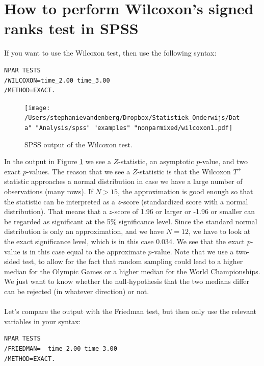 \documentclass[]{report}\usepackage[]{graphicx}\usepackage[]{color}
\begin{document}
\section{How to perform Wilcoxon's signed ranks test in SPSS}

If you want to use the Wilcoxon test, then use the following syntax:

\begin{verbatim}
NPAR TESTS
/WILCOXON=time_2.00 time_3.00
/METHOD=EXACT.
\end{verbatim}


\begin{figure}[h]
    \begin{center}
       \texttt{[image: /Users/stephanievandenberg/Dropbox/Statistiek\_Onderwijs/Data" "Analysis/spss" "examples" "nonparmixed/wilcoxon1.pdf]}
    \end{center}
    \caption{SPSS output of the Wilcoxon test.}
    \label{fig:wilcoxon1}
\end{figure}

In the output in Figure \ref{fig:wilcoxon1} we see a $Z$-statistic, an asymptotic $p$-value, and two exact $p$-values. The reason that we see a $Z$-statistic is that the Wilcoxon $T^+$ statistic approaches a normal distribution in case we have a large number of observations (many rows). If $N>15$, the approximation is good enough so that the statistic can be interpreted as a $z$-score (standardized score with a normal distribution). That means that a $z$-score of 1.96 or larger or -1.96 or smaller can be regarded as significant at the 5\% significance level. Since the standard normal distribution is only an approximation, and we have $N=12$, we have to look at the exact significance level, which is in this case 0.034. We see that the exact $p$-value is in this case equal to the approximate $p$-value. Note that we use a two-sided test, to allow for the fact that random sampling could lead to a higher median for the Olympic Games or a higher median for the World Championships. We just want to know whether the null-hypothesis that the two medians differ can be rejected (in whatever direction) or not.
\\
\\


Let's compare the output with the Friedman test, but then only use the relevant variables in your syntax:

\begin{verbatim}
NPAR TESTS
/FRIEDMAN=  time_2.00 time_3.00
/METHOD=EXACT.
\end{verbatim}
\end{document}
